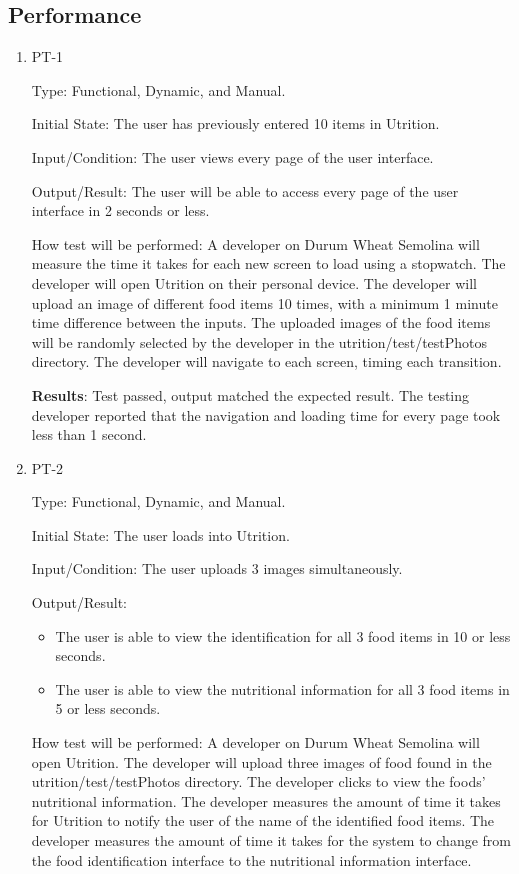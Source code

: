 \documentclass[12pt, titlepage]{article}
\begin{document}
	\subsection{Performance}
	
	\begin{enumerate}
		
		\item{PT-1} 
		
		Type: Functional, Dynamic, and Manual.
		
		Initial State: The user has previously entered 10 items in Utrition.
		
		Input/Condition: The user views every page of the user interface.
		
		Output/Result: The user will be able to access every page of the user interface in 2 seconds or less.
		
		How test will be performed: A developer on Durum Wheat Semolina will measure the time it takes for each new screen to load using a stopwatch. The developer will open Utrition on their personal device. The developer will upload an image of different food items 10 times, with a minimum 1 minute time difference between the inputs. The uploaded images of the food items will be randomly selected by the developer in the utrition/test/testPhotos directory. The developer will navigate to each screen, timing each transition.
		
		\textbf{Results}: Test passed, output matched the expected result. The testing developer reported that the navigation and loading time for every page took less than 1 second.
		
		\item{PT-2} 
		
		Type: Functional, Dynamic, and Manual.
		
		Initial State: The user loads into Utrition.
		
		Input/Condition: The user uploads 3 images simultaneously.
		
		Output/Result: 
		\begin{itemize}
			\item The user is able to view the identification for all 3 food items in 10 or less seconds.
			\item The user is able to view the nutritional information for all 3 food items in 5 or less seconds.
		\end{itemize}
		
		How test will be performed: A developer on Durum Wheat Semolina will 
		open Utrition. The developer 
		will upload three images of food found in the utrition/test/testPhotos 
		directory. The developer clicks to view 
		the foods’ nutritional information. The developer measures the amount 
		of time it takes for Utrition to notify the user of the name of the 
		identified food items. The developer measures the amount of time it 
		takes for the system to change from the food identification interface 
		to the nutritional information interface.
		

\end{enumerate}
\end{document}
